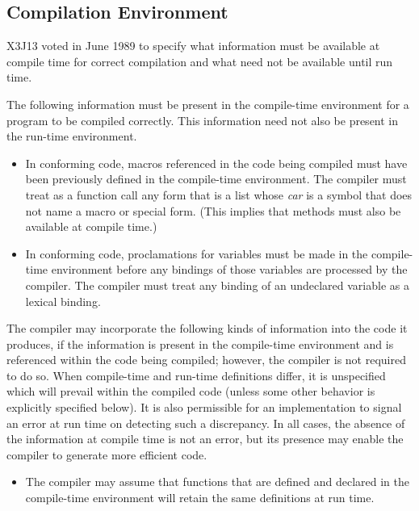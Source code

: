 \begin{newer}
\subsection{Compilation Environment}

X3J13 voted in June 1989 
to specify what information must be available at compile time
for correct compilation
and what need not be available until run time.

The following information must be present in the compile-time
environment for a program to be compiled correctly.  This
information need not also be present in the run-time environment.
\begin{itemize}
\item In conforming code, macros referenced in the code being compiled
        must have been previously defined in the compile-time environment.
	The compiler must treat as a function call any form that is a list whose {\it car} is
	a symbol that does not name a macro or special form.
  (This implies that  methods must also be available at
	compile time.)

\item In conforming code, proclamations for  variables must
        be made in the compile-time environment before any bindings of
        those variables are processed by the compiler.  The compiler
        must treat any binding of an undeclared variable as a lexical
        binding.
\end{itemize}


The compiler may incorporate the following kinds of information
into the code it produces, if the information is present in the
compile-time environment and is referenced within the code being
compiled; however, the compiler is not required to do so.
When compile-time and run-time definitions differ, it is
unspecified which will prevail within the compiled code
(unless some other behavior is explicitly specified below).  It is also
permissible for an implementation to signal an error at run time on
detecting such a discrepancy.  In all cases, the absence of the
information at compile time is not an error, but its presence may
enable the compiler to generate more efficient code.
\begin{itemize}
\item The compiler may assume that functions that are defined and
	declared  in the compile-time environment will retain the
        same definitions at run time.


\end{itemize}
\end{newer}
